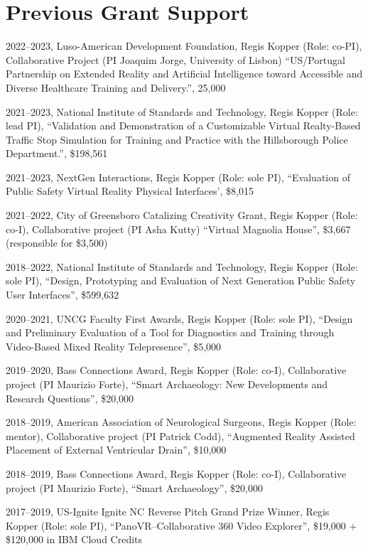 \documentclass[wideaddress]{vitae}
\let\olditem\item
\def\item{\nopagebreak[4]\olditem}%
\begin{document}
\section{Previous Grant Support}
\begin{etaremune}
	\item{2022--2023, Luso-American Development Foundation, Regis Kopper (Role: co-PI), Collaborative Project (PI Joaquim Jorge, University of Lisbon) ``US/Portugal Partnership on Extended Reality and Artificial Intelligence toward Accessible and Diverse Healthcare Training and Delivery.'', 25,000~\EURtm}
	\item{2021--2023, National Institute of Standards and Technology, Regis Kopper (Role: lead PI), ``Validation and Demonstration of a Customizable Virtual Realty-Based Traffic Stop Simulation for Training and Practice with the Hillsborough Police Department.'', \$198,561}
	\item{2021--2023, NextGen Interactions, Regis Kopper (Role: sole PI), ``Evaluation of Public Safety Virtual Reality Physical Interfaces', \$8,015}
	\item{2021--2022, City of Greensboro Catalizing Creativity Grant, Regis Kopper (Role: co-I), Collaborative project (PI Asha Kutty) ``Virtual Magnolia House'', \$3,667 (responsible for \$3,500)}
	\item{2018--2022, National Institute of Standards and Technology, Regis Kopper (Role: sole PI), ``Design, Prototyping and Evaluation of Next Generation Public Safety User Interfaces'', \$599,632}
	\item{2020--2021, UNCG Faculty First Awards, Regis Kopper (Role: sole PI), ``Design and Preliminary Evaluation of a Tool for Diagnostics and Training through Video-Based Mixed Reality Telepresence'', \$5,000}
	\item{2019--2020, Bass Connections Award, Regis Kopper (Role: co-I), Collaborative project (PI Maurizio Forte), ``Smart Archaeology: New Developments and Research Questions'', \$20,000}
	\item{2018--2019, American Association of Neurological Surgeons, Regis Kopper (Role: mentor), Collaborative project (PI Patrick Codd), ``Augmented Reality Assisted Placement of External Ventricular Drain'', \$10,000}
	\item{2018--2019, Bass Connections Award, Regis Kopper (Role: co-I), Collaborative project (PI Maurizio Forte), ``Smart Archaeology'', \$20,000}
	\item{2017--2019, US-Ignite Ignite NC Reverse Pitch Grand Prize Winner, Regis Kopper (Role: sole PI), ``PanoVR--Collaborative 360\textdegree{} Video Explorer'', \$19,000 + \$120,000 in IBM Cloud Credits}

\end{etaremune}
\end{document}
